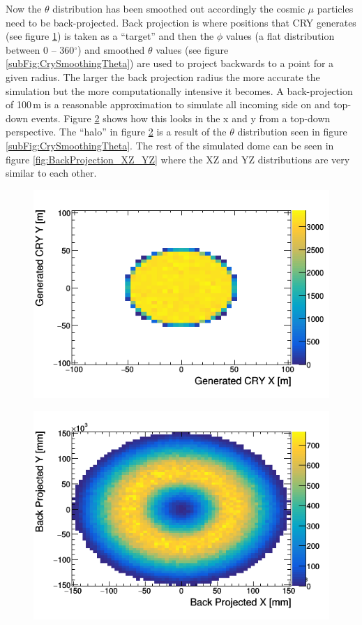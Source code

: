Now the $\theta$ distribution has been smoothed out accordingly the cosmic $\mu$ particles need to be back-projected. Back projection is where positions that CRY generates (see figure \ref{fig:cryxm_vs_cryym}) is taken as a ``target'' and then the $\phi$ values (a flat distribution between 0 -- 360$^\circ$) and smoothed $\theta$ values (see figure \ref{subFig:CrySmoothingTheta}) are used to project backwards to a point for a given radius. The larger the back projection radius the more accurate the simulation but the more computationally intensive it becomes. A back-projection of 100\,m is a reasonable approximation to simulate all incoming side on and top-down events. Figure \ref{fig:BackProjectionXY} shows how this looks in the x and y from a top-down perspective. The ``halo'' in figure \ref{fig:BackProjectionXY} is a result of the $\theta$ distribution seen in figure \ref{subFig:CrySmoothingTheta}. The rest of the simulated dome can be seen in figure \ref{fig:BackProjection_XZ_YZ} where the XZ and YZ distributions are very similar to each other. 

\begin{figure}[!h]
 \centering
 \includegraphics[width=0.7\linewidth]{Chapter4/Figs/Raster/CryPlots/cryxm_vs_cryym.png}
 \label{fig:cryxm_vs_cryym}
\end{figure}

\begin{figure}[!h]
 \centering
 \includegraphics[width=0.7\linewidth]{Chapter4/Figs/Raster/CryPlots/BackProjectionXY.png}
 \label{fig:BackProjectionXY}
\end{figure}

